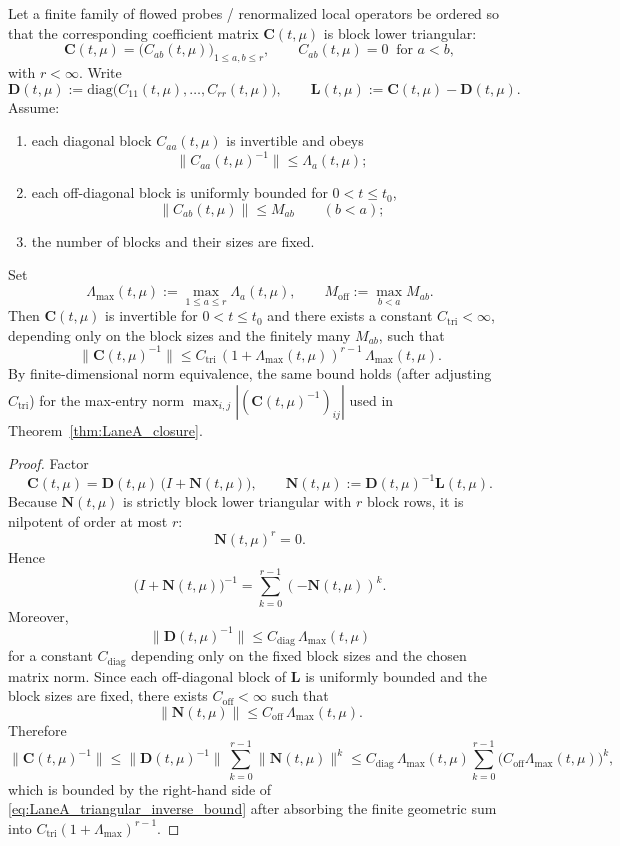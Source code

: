 \begin{proposition}\label{prop:LaneA_triangular_assembly}
Let a finite family of flowed probes / renormalized local operators be ordered so that the corresponding coefficient matrix
$\mathbf C(t,\mu)$ is block lower triangular:
\[
\mathbf C(t,\mu)=\bigl(C_{ab}(t,\mu)\bigr)_{1\le a,b\le r},
\qquad
C_{ab}(t,\mu)=0 \ \text{ for } a<b,
\]
with $r<\infty$.
Write
\[
\mathbf D(t,\mu):=\mathrm{diag}\bigl(C_{11}(t,\mu),\dots,C_{rr}(t,\mu)\bigr),
\qquad
\mathbf L(t,\mu):=\mathbf C(t,\mu)-\mathbf D(t,\mu).
\]
Assume:
\begin{enumerate}[label=(\roman*),leftmargin=2.3em]
\item each diagonal block $C_{aa}(t,\mu)$ is invertible and obeys
\[
\|C_{aa}(t,\mu)^{-1}\|\le \Lambda_a(t,\mu);
\]
\item each off-diagonal block is uniformly bounded for $0<t\le t_0$,
\[
\|C_{ab}(t,\mu)\|\le M_{ab}\qquad (b<a);
\]
\item the number of blocks and their sizes are fixed.
\end{enumerate}
Set
\[
\Lambda_{\max}(t,\mu):=\max_{1\le a\le r}\Lambda_a(t,\mu),
\qquad
M_{\mathrm{off}}:=\max_{b<a} M_{ab}.
\]
Then $\mathbf C(t,\mu)$ is invertible for $0<t\le t_0$ and there exists a constant $C_{\mathrm{tri}}<\infty$,
depending only on the block sizes and the finitely many $M_{ab}$, such that
\begin{equation}\label{eq:LaneA_triangular_inverse_bound}
\|\mathbf C(t,\mu)^{-1}\|
\le
C_{\mathrm{tri}}\,(1+\Lambda_{\max}(t,\mu))^{r-1}\,\Lambda_{\max}(t,\mu).
\end{equation}
By finite-dimensional norm equivalence, the same bound holds (after adjusting $C_{\mathrm{tri}}$) for the max-entry norm
$\max_{i,j}|(\mathbf C(t,\mu)^{-1})_{ij}|$ used in Theorem~\ref{thm:LaneA_closure}.
\end{proposition}

\begin{proof}
Factor
\[
\mathbf C(t,\mu)=\mathbf D(t,\mu)\,\bigl(I+\mathbf N(t,\mu)\bigr),
\qquad
\mathbf N(t,\mu):=\mathbf D(t,\mu)^{-1}\mathbf L(t,\mu).
\]
Because $\mathbf N(t,\mu)$ is strictly block lower triangular with $r$ block rows, it is nilpotent of order at most $r$:
\[
\mathbf N(t,\mu)^r=0.
\]
Hence
\[
\bigl(I+\mathbf N(t,\mu)\bigr)^{-1}
=
\sum_{k=0}^{r-1}(-\mathbf N(t,\mu))^k.
\]
Moreover,
\[
\|\mathbf D(t,\mu)^{-1}\|
\le C_{\mathrm{diag}}\,\Lambda_{\max}(t,\mu)
\]
for a constant $C_{\mathrm{diag}}$ depending only on the fixed block sizes and the chosen matrix norm.
Since each off-diagonal block of $\mathbf L$ is uniformly bounded and the block sizes are fixed,
there exists $C_{\mathrm{off}}<\infty$ such that
\[
\|\mathbf N(t,\mu)\|\le C_{\mathrm{off}}\,\Lambda_{\max}(t,\mu).
\]
Therefore
\[
\|\mathbf C(t,\mu)^{-1}\|
\le
\|\mathbf D(t,\mu)^{-1}\|\,
\sum_{k=0}^{r-1}\|\mathbf N(t,\mu)\|^k
\le
C_{\mathrm{diag}}\,\Lambda_{\max}(t,\mu)\sum_{k=0}^{r-1}\bigl(C_{\mathrm{off}}\Lambda_{\max}(t,\mu)\bigr)^k,
\]
which is bounded by the right-hand side of \eqref{eq:LaneA_triangular_inverse_bound} after absorbing the finite geometric sum into
$C_{\mathrm{tri}}(1+\Lambda_{\max})^{r-1}$.
\end{proof}

